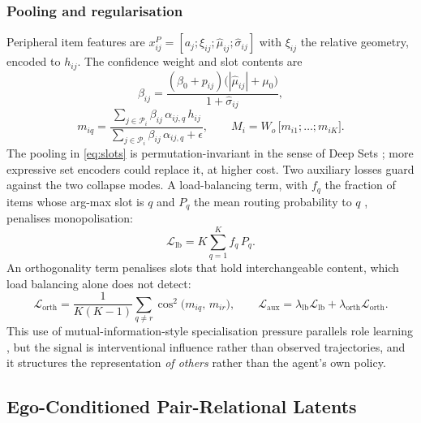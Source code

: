 \documentclass[conference]{IEEEtran}
\begin{document}
\subsubsection{Pooling and regularisation}
Peripheral item features are $x^{P}_{ij}=[a_j;\xi_{ij};\hat\mu_{ij};\hat\sigma_{ij}]$ with $\xi_{ij}$ the relative geometry, encoded to $h_{ij}$. The confidence weight and slot contents are
\begin{equation}
\beta_{ij}=\frac{(\beta_0+p_{ij})\big(|\hat\mu_{ij}|+\mu_0\big)}{1+\hat\sigma_{ij}},
\label{eq:beta}
\end{equation}
\begin{equation}
m_{iq}=\frac{\sum_{j\in\mathcal{P}_i}\beta_{ij}\,\alpha_{ij,q}\,h_{ij}}{\sum_{j\in\mathcal{P}_i}\beta_{ij}\,\alpha_{ij,q}+\epsilon},
\qquad
M_i=W_o\,\big[m_{i1};\dots;m_{iK}\big].
\label{eq:slots}
\end{equation}
The pooling in \eqref{eq:slots} is permutation-invariant in the sense of Deep Sets \cite{zaheer2017deepsets}; more expressive set encoders \cite{lee2019settransformer} could replace it, at higher cost. Two auxiliary losses guard against the two collapse modes. A load-balancing term, with $f_q$ the fraction of items whose arg-max slot is $q$ and $P_q$ the mean routing probability to $q$ \cite{fedus2022switch}, penalises monopolisation:
\begin{equation}
\mathcal{L}_{\mathrm{lb}}=K\sum_{q=1}^{K}f_q\,P_q .
\label{eq:lb}
\end{equation}
An orthogonality term penalises slots that hold interchangeable content, which load balancing alone does not detect:
\begin{equation}
\mathcal{L}_{\mathrm{orth}}=\frac{1}{K(K-1)}\sum_{q\neq r}\cos^{2}\!\big(m_{iq},\,m_{ir}\big),
\qquad
\mathcal{L}_{\mathrm{aux}}=\lambda_{\mathrm{lb}}\mathcal{L}_{\mathrm{lb}}+\lambda_{\mathrm{orth}}\mathcal{L}_{\mathrm{orth}} .
\label{eq:orth}
\end{equation}
This use of mutual-information-style specialisation pressure parallels role learning \cite{wang2020roma}, but the signal is interventional influence rather than observed trajectories, and it structures the representation \emph{of others} rather than the agent's own policy.

\subsection{Ego-Conditioned Pair-Relational Latents}
\end{document}
